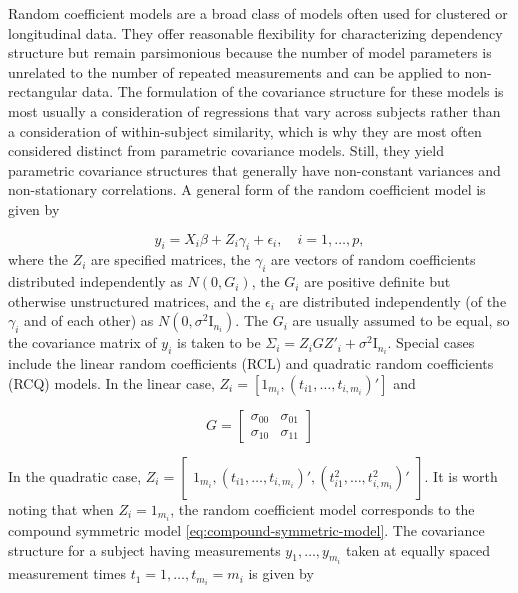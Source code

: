 \bigskip

Random coefficient models are a broad class of models often used for clustered or longitudinal data. They offer reasonable flexibility for characterizing dependency structure but remain parsimonious because the number of model parameters is unrelated to the number of repeated measurements and can be applied to non-rectangular data.  The formulation of the covariance structure for these models is most usually a consideration of regressions that vary across subjects rather than a consideration of within-subject similarity, which is why they are most often considered distinct from parametric covariance models. Still, they yield parametric covariance structures that generally have non-constant variances and non-stationary correlations.  A general form of the random coefficient model is given by 

\begin{equation}
y_i = X_i\beta + Z_i \gamma_i + \epsilon_i, \quad i = 1, \dots, p,
\end{equation}
\noindent
where the $Z_i$ are specified matrices, the $\gamma_i$ are vectors of random coefficients distributed independently as $N \left(0, G_i\right)$, the $G_i$ are positive definite but otherwise unstructured matrices, and the $\epsilon_i$ are distributed independently (of the $\gamma_i$ and of each other) as $N \left(0, \sigma^2 \mathrm{I}_{n_i}\right)$. The $G_i$ are usually assumed to be equal, so the covariance matrix of $y_i$ is taken to be $\Sigma_i = Z_i GZ'_i + \sigma^2 \mathrm{I}_{n_i}$. Special cases include the linear random coefficients (RCL) and quadratic random coefficients (RCQ) models. In the linear case, $Z_i = \left[1_{m_i} , \left(t_{i1},\dots,t_{i, m_i}\right)'\right]$ and 

\begin{equation*}
G = \begin{bmatrix}
\sigma_{00} & \sigma_{01} \\
\sigma_{10} & \sigma_{11} 
\end{bmatrix}
\end{equation*}

\noindent
In the quadratic case, $Z_i =\begin{bmatrix}1_{m_i}, \left(t_{i1}, \dots, t_{i,m_i}\right)', \left(t^2_{i1}, \dots, t^2_{i,m_i}\right)'\end{bmatrix}$. It is worth noting that when $Z_i = 1_{m_i}$, the random coefficient model corresponds to the compound symmetric model \ref{eq:compound-symmetric-model}. The covariance structure for a subject having measurements $y_1,\dots, y_{m_i}$ taken at equally spaced measurement times $t_1 = 1, \dots,t_{m_i} = m_i$ is given by  



